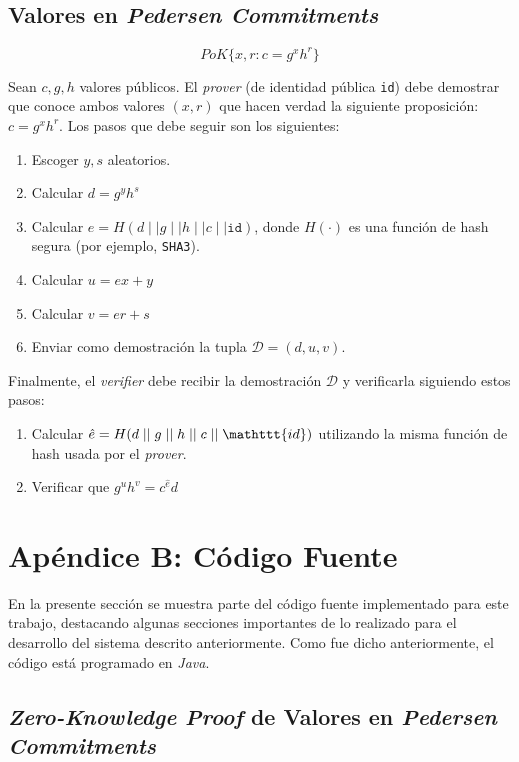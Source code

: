 \subsection{Valores en \emph{Pedersen Commitments}}

$$PoK\{x, r : c = g^x h^r\}$$

Sean $c, g, h$ valores públicos. El \emph{prover} (de identidad pública 
\texttt{id}) debe demostrar que conoce ambos valores $(x,r)$ que hacen verdad 
la siguiente proposición: $c = g^x h^r$. Los pasos que debe seguir son los 
siguientes:
\begin{enumerate}
	\item Escoger $y, s$ aleatorios.
	\item Calcular $d = g^y h^s$
	\item Calcular $e = H(d \mid\mid g \mid\mid h \mid\mid c \mid\mid \mathtt{id})$, donde $H(\cdot)$ es una función de hash segura (por ejemplo, \texttt{SHA3}).
	\item Calcular $u = ex + y$
	\item Calcular $v = er + s$
	\item Enviar como demostración la tupla $\mathcal{D} = (d, u, v)$.
\end{enumerate}

Finalmente, el \emph{verifier} debe recibir la demostración $\mathcal{D}$ y 
verificarla siguiendo estos pasos:
\begin{enumerate}
	\item Calcular $\hat{e} = H(d \mid\mid g \mid\mid h \mid\mid c \mid\mid \mathttt{id})$ utilizando la misma función de hash usada por el \emph{prover}.
	\item Verificar que $g^u h^v = c^\hat{e} d$
\end{enumerate}

\section{Apéndice B: Código Fuente}\label{apen-b}

En la presente sección se muestra parte del código fuente implementado para este trabajo, 
destacando algunas secciones importantes de lo realizado para el desarrollo 
del sistema descrito anteriormente. Como fue dicho anteriormente, el código está 
programado en \emph{Java}.

\subsection{\emph{Zero-Knowledge Proof} de Valores en \emph{Pedersen Commitments}}

